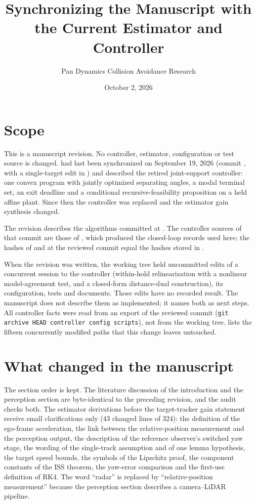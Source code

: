 \documentclass[11pt]{article}
\title{Synchronizing the Manuscript with the Current Estimator and Controller}
\author{Pan Dynamics Collision Avoidance Research}
\date{October 2, 2026}
\begin{document}
\maketitle

\section{Scope}
This is a manuscript revision. No controller, estimator, configuration or
test source is changed.  had last been
synchronized on September 19, 2026 (commit , with a
single-target edit in ) and described the retired
joint-support controller: one convex program with jointly optimized
separating angles, a modal terminal set, an exit deadline and a conditional
recursive-feasibility proposition on a held affine plant. Since then the
controller was replaced and the estimator gain synthesis changed.

The revision describes the algorithms committed at
. The controller sources of
that commit are those of ,
which produced the closed-loop records used here; the hashes of
 and
 at the reviewed commit equal
the hashes stored in
.

When the revision was written, the working tree held uncommitted edits of a
concurrent session to the controller (within-hold relinearization with a
nonlinear model-agreement test, and a closed-form distance-dual
construction), its configuration, tests and documents. Those edits have no
recorded result. The manuscript does not describe them as implemented; it
names both as next steps. All controller facts were read from an export of
the reviewed commit (\texttt{git archive HEAD controller config scripts}),
not from the working tree.  lists the fifteen
concurrently modified paths that this change leaves untouched.

\section{What changed in the manuscript}
The section order is kept. The literature discussion of the introduction
and the perception section are byte-identical to the preceding revision, and
the audit checks both. The estimator derivations before the target-tracker
gain statement receive small clarifications only (43 changed lines of 324):
the definition of the ego-frame acceleration, the link between the
relative-position measurement and the perception output, the description of
the reference observer's switched yaw stage, the wording of the
single-track assumption and of one lemma hypothesis, the target speed
bounds, the symbols of the Lipschitz proof, the component constants of the
ISS theorem, the yaw-error comparison and the first-use definition of RK4.
The word ``radar'' is replaced by ``relative-position measurement''
because the perception section describes a camera--LiDAR pipeline.
\end{document}

